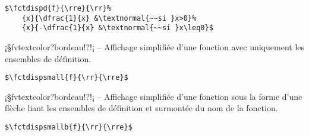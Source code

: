 \documentclass[11pt,a4paper,rgb]{report}
\begin{document}
\setlength{\leftskip}{.75cm}%
\setlength{\textwidth}{17.25cm}%

\colorbox{blue!15}{}
\hfill
\begin{minipage}{.65\textwidth}
	\begin{lstlisting}[linewidth=\textwidth, language={[LaTeX]TeX}]
	$\fctdispd{f}{\rre}{\rr}%
	{x}{\dfrac{1}{x} &\textnormal{~~si }x>0}%
	{x}{-\dfrac{1}{x} &\textnormal{~~si }x\leq0}$
	\end{lstlisting}
\end{minipage}

\setlength{\leftskip}{0pt}
\setlength{\textwidth}{18cm}%


\vspace*{.75cm}

\inCodeStub¡§fvtextcolor?bordeau!?!¡ -- Affichage simplifiée d'une fonction avec uniquement les ensembles de définition.

\setlength{\leftskip}{.75cm}%
\setlength{\textwidth}{17.25cm}%

\colorbox{blue!15}{}
\hfill
\begin{minipage}{.65\textwidth}
	\begin{lstlisting}[linewidth=\textwidth, language={[LaTeX]TeX}]
	$\fctdispsmall{f}{\rr}{\rre}$
	\end{lstlisting}
\end{minipage}

\setlength{\leftskip}{0pt}
\setlength{\textwidth}{18cm}%


\vspace*{.75cm}

\inCodeStub¡§fvtextcolor?bordeau!?!¡ -- Affichage simplifiée d'une fonction sous la forme d'une flèche liant les ensembles de définition et surmontée du nom de la fonction.

\setlength{\leftskip}{.75cm}%
\setlength{\textwidth}{17.25cm}%

\colorbox{blue!15}{}
\hfill
\begin{minipage}{.65\textwidth}
	\begin{lstlisting}[linewidth=\textwidth, language={[LaTeX]TeX}]
	$\fctdispsmallb{f}{\rr}{\rre}$
	\end{lstlisting}
\end{minipage}
\end{document}
